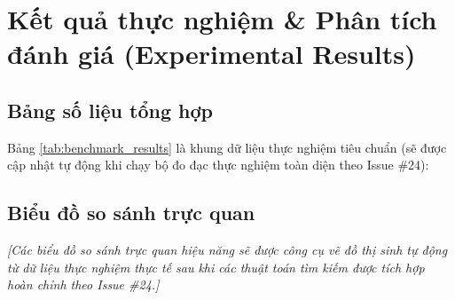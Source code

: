 \chapter{Kết quả thực nghiệm \& Phân tích đánh giá (Experimental Results)}

\newpage

\section{Bảng số liệu tổng hợp}
Bảng \ref{tab:benchmark_results} là khung dữ liệu thực nghiệm tiêu chuẩn (sẽ được cập nhật tự động khi chạy bộ đo đạc thực nghiệm toàn diện theo Issue \#24):



\section{Biểu đồ so sánh trực quan}
\textit{[Các biểu đồ so sánh trực quan hiệu năng sẽ được công cụ vẽ đồ thị sinh tự động từ dữ liệu thực nghiệm thực tế sau khi các thuật toán tìm kiếm được tích hợp hoàn chỉnh theo Issue \#24.]}

